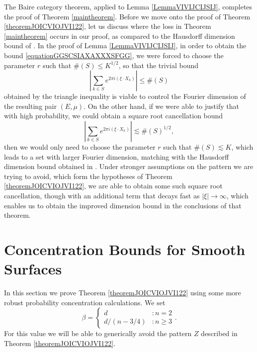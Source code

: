 \documentclass[12pt,reqno]{article}
\numberwithin{equation}{section}
\numberwithin{theorem}{section}
\begin{document}
The Baire category theorem, applied to Lemma \ref{LemmaVIVIJCIJSIJ}, completes the proof of Theorem \ref{maintheorem}. Before we move onto the proof of Theorem \ref{theoremJOICVIOJVI122}, let us discuss where the loss in Theorem \ref{maintheorem} occurs in our proof, as compared to the Hausdorff dimension bound of \cite{OurPaper}. In the proof of Lemma \ref{LemmaVIVIJCIJSIJ}, in order to obtain the bound \eqref{equationGGSCSIAXAXXXSFGG}, we were forced to choose the parameter $r$ such that $\#(S) \leq K^{1/2}$, so that the trivial bound
%
\begin{equation}
    \left| \sum_{k \in S} e^{2 \pi i (\xi \cdot X_k)} \right| \leq \#(S)
\end{equation}
%
obtained by the triangle inequality is viable to control the Fourier dimension of the resulting pair $(E,\mu)$. On the other hand, if we were able to justify that with high probability, we could obtain a square root cancellation bound
%
\begin{equation}
    \left| \sum_{k \in S} e^{2 \pi i (\xi \cdot X_k)} \right| \lesssim \#(S)^{1/2},
\end{equation}
%
then we would only need to choose the parameter $r$ such that $\#(S) \lesssim K$, which leads to a set with larger Fourier dimension, matching with the Hausdorff dimension bound obtained in \cite{OurPaper}. Under stronger assumptions on the pattern we are trying to avoid, which form the hypotheses of Theorem \ref{theoremJOICVIOJVI122}, we are able to obtain some such square root cancellation, though with an additional term that decays fast as $|\xi| \to \infty$, which enables us to obtain the improved dimension bound in the conclusions of that theorem.

\section{Concentration Bounds for Smooth Surfaces}

In this section we prove Theorem \ref{theoremJOICVIOJVI122} using some more robust probability concentration calculations. We set
%
\[ \beta = \begin{cases} d &: n = 2 \\ d/(n - 3/4) &: n \geq 3 \end{cases}. \]
%
For this value we will be able to generically avoid the pattern $Z$ described in Theorem \ref{theoremJOICVIOJVI122}.
\end{document}
